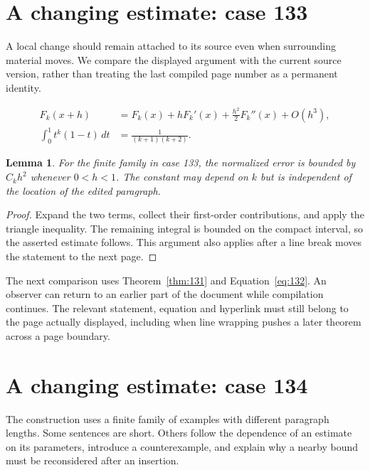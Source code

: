 \documentclass[a4paper,10pt]{article}
\newtheorem{lemma}[theorem]{Lemma}
\begin{document}
\lipsum[8]

\section{A changing estimate: case 133}\label{unit:132}
A local change should remain attached to its source even when surrounding material moves. We compare the displayed argument with the current source version, rather than treating the last compiled page number as a permanent identity.

\lipsum[7-8]
\begin{align}\label{eq:132}
 F_k(x+h)&=F_k(x)+hF_k'(x)+\frac{h^2}{2}F_k''(x)+O(h^3),\\
 \int_0^1 t^k(1-t)\,dt&=\frac{1}{(k+1)(k+2)}.
\end{align}
\begin{lemma}\label{thm:132}
For the finite family in case 133, the normalized error is bounded by $C_k h^2$ whenever $0<h<1$. The constant may depend on $k$ but is independent of the location of the edited paragraph.
\end{lemma}
\begin{proof}
Expand the two terms, collect their first-order contributions, and apply the
triangle inequality. The remaining integral is bounded on the compact interval,
so the asserted estimate follows. This argument also applies after a line break
moves the statement to the next page.
\end{proof}
The next comparison uses Theorem~\ref{thm:131} and Equation~\ref{eq:132}. An observer can return to an earlier part of the document while compilation continues. The relevant statement, equation and hyperlink must still belong to the page actually displayed, including when line wrapping pushes a later theorem across a page boundary.

\lipsum[13]

\section{A changing estimate: case 134}\label{unit:133}
The construction uses a finite family of examples with different paragraph lengths. Some sentences are short. Others follow the dependence of an estimate on its parameters, introduce a counterexample, and explain why a nearby bound must be reconsidered after an insertion.
\end{document}
